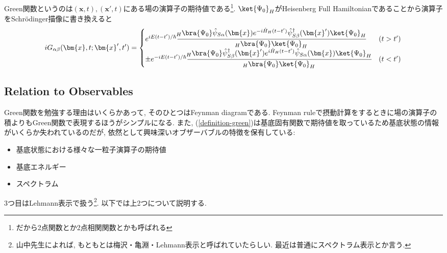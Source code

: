 \documentclass[10.5pt,a4paper]{jreport}
\begin{document}
Green関数というのは$(\bm{x}, t), (\bm{x}', t)$にある場の演算子の期待値である\footnote{だから2点関数とか2点相関関数とかも呼ばれる}. $\ket{\Psi_0}_H$がHeisenberg Full Hamiltonianであることから演算子をSchr\"odinger描像に書き換えると
\begin{eqnarray}
  iG_{\alpha\beta}(\bm{x}, t;\bm{x}', t') =
  \begin{cases}
    e^{iE(t-t')/\hbar}\cfrac{\!_H\bra{\Psi_0}\hat{\psi}_{S\alpha}(\bm{x})e^{-i\hat{H}_H(t-t')}\hat{\psi}_{S\beta}^\dagger(\bm{x}')\ket{\Psi_0}_H}{\!_H\bra{\Psi_0}\ket{\Psi_0}_H} & (t > t')\\
    \pm e^{-iE(t-t')/\hbar}\cfrac{\!_H\bra{\Psi_0}\hat{\psi}_{S\beta}^\dagger(\bm{x}')e^{i\hat{H}_H(t-t')}\hat{\psi}_{S\alpha}(\bm{x})\ket{\Psi_0}_H}{\!_H\bra{\Psi_0}\ket{\Psi_0}_H} & (t < t')
  \end{cases}
  \label{definition-green3}
\end{eqnarray}
\subsection{Relation to Observables}
Green関数を勉強する理由はいくらかあって, そのひとつはFeynman diagramである. Feynman ruleで摂動計算をするときに場の演算子の積よりもGreen関数で表現するほうがシンプルになる. また, (\ref{definition-green})は基底固有関数で期待値を取っているため基底状態の情報がいくらか失われているのだが, 依然として興味深いオブザーバブルの特徴を保有している:
\begin{itemize}
\item 基底状態における様々な一粒子演算子の期待値
\item 基底エネルギー
\item スペクトラム
\end{itemize}
3つ目はLehmann表示で扱う\footnote{山中先生によれば, もともとは梅沢・亀淵・Lehmann表示と呼ばれていたらしい. 最近は普通にスペクトラム表示とか言う. }. 以下では上2つについて説明する.
\end{document}
